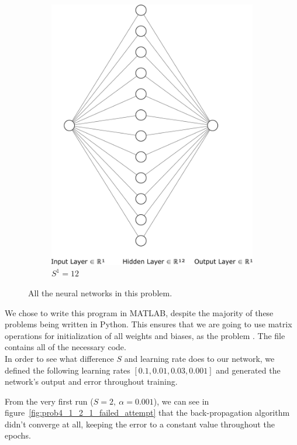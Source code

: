 \begin{figure}[H]
\begin{subfigure}{0.47\textwidth}
		\includegraphics[width=\textwidth]{../Problem 4/nn_1_12_1.pdf}
		\caption{$S^1=12$}
	\end{subfigure}
	\caption{All the neural networks in this problem.}
	\label{fig:prob4_nns}
\end{figure}

We chose to write this program in MATLAB, despite the majority of these problems being written in Python. This ensures that we are going to use matrix operations for initialization of all weights and biases, as the problem .
The file  contains all of the necessary code.\\

In order to see what difference $S$ and learning rate does to our network, we defined the following learning rates $\left[0.1, 0.01, 0.03, 0.001\right]$ and generated the network's output and error throughout training.

From the very first run ($S=2,\ \alpha=0.001$), we can see in figure~\ref{fig:prob4_1_2_1_failed_attempt} that the back-propagation algorithm didn't converge at all, keeping the error to a constant value throughout the epochs.

